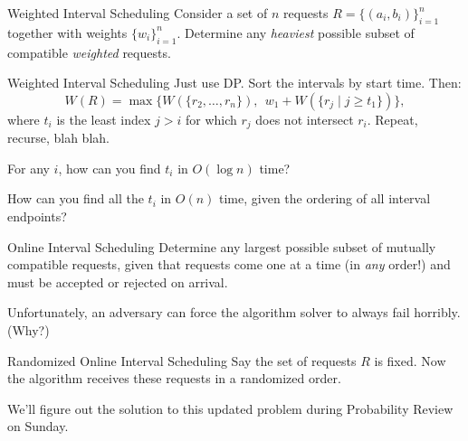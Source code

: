 \begin{problem}{Weighted Interval Scheduling}
Consider a set of $n$ requests $R = \{(a_i, b_i)\}_{i = 1}^n$ together with weights $\{w_i\}_{i = 1}^n$.  Determine any \emph{heaviest} possible subset of compatible \emph{weighted} requests.
\end{problem}

\begin{solution}{Weighted Interval Scheduling}
    Just use DP.  Sort the intervals by start time.  Then:
    \[ W(R) = \max \{ W(\{r_2, \dots, r_n\}), \ \  w_1 + W(\{r_j \mid j \geq t_1\})\}, \]
    where $t_i$ is the least index $j > i$ for which $r_j$ does not intersect $r_i$.  Repeat, recurse, blah blah.
\end{solution}

\begin{remark}
    For any $i$, how can you find $t_i$ in $O(\log n)$ time?
    
    How can you find all the $t_i$ in $O(n)$ time, given the ordering of all interval endpoints?
\end{remark}

\begin{problem}{Online Interval Scheduling}
Determine any largest possible subset of mutually compatible requests, given that requests come one at a time (in \emph{any} order!) and must be accepted or rejected on arrival.
\end{problem}

Unfortunately, an adversary can force the algorithm solver to always fail horribly.  (Why?)

\begin{problem}{Randomized Online Interval Scheduling}
Say the set of requests $R$ is fixed.  Now the algorithm receives these requests in a randomized order.
\end{problem}

We'll figure out the solution to this updated problem during Probability Review on Sunday.

